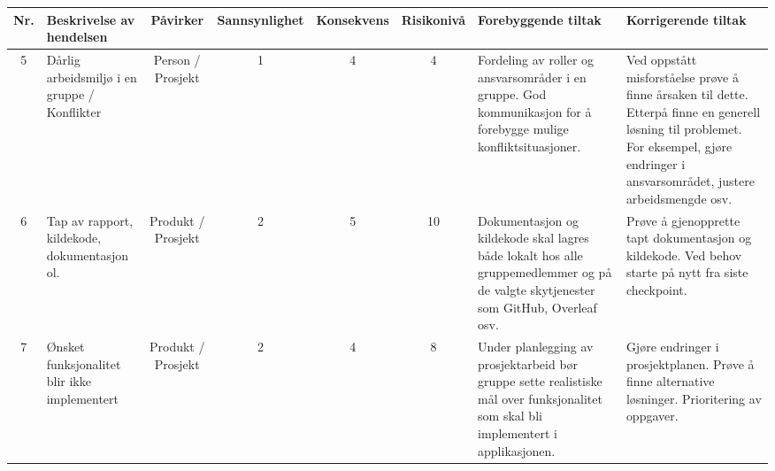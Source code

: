 \begin{landscape}
\begin{longtable}[H]
\begin{tabular}{|c|p{4cm}|c|c|c|c|p{4cm}|p{4cm}|}
\pagebreak

Nr. & Beskrivelse av hendelsen & Påvirker & Sannsynlighet & Konsekvens & Risikonivå & Forebyggende tiltak & Korrigerende tiltak  \\
\hline\hline
5 & Dårlig arbeidsmiljø i en gruppe / Konflikter & Person / Prosjekt & 1 & 4 & 4 & Fordeling av roller og ansvarsområder i en gruppe. God kommunikasjon for å forebygge mulige konfliktsituasjoner.  & Ved oppstått misforståelse prøve å finne årsaken til dette. Etterpå finne en generell løsning til problemet. For eksempel, gjøre endringer i ansvarsområdet, justere arbeidsmengde osv.  \\
\hline
6 & Tap av rapport, kildekode, dokumentasjon ol. & Produkt / Prosjekt & 2 & 5 & 10 & Dokumentasjon og kildekode skal lagres både lokalt hos alle gruppemedlemmer og på de valgte skytjenester som GitHub, Overleaf osv.  & Prøve å gjenopprette tapt dokumentasjon og kildekode. Ved behov starte på nytt fra siste checkpoint.  \\
\hline
7 & Ønsket funksjonalitet blir ikke implementert & Produkt / Prosjekt & 2 & 4 & 8 & Under planlegging av prosjektarbeid bør gruppe sette realistiske mål over funksjonalitet som skal bli implementert i applikasjonen.   & Gjøre endringer i prosjektplanen. Prøve å finne alternative løsninger. Prioritering av oppgaver.   \\
\hline
\end{tabular}
\caption{Risikotabell som viser mulige uønskede hendelser, grad av sannsynlighet, grad av konsekvens, beregnet risikonivå og mulige tiltak \cite{4-forelesning-risikonalyse}.}
\label{table}
\end{longtable}
\end{landscape}